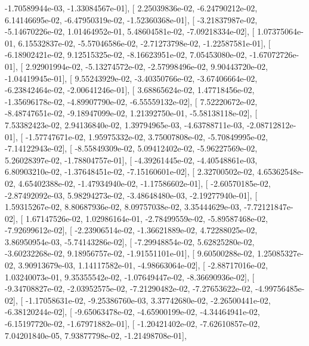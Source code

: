 \documentclass{article}
\begin{document}
         -1.70589944e-03,  -1.33084567e-01],
       [  2.25039836e-02,  -6.24790212e-02,   6.14146695e-02,
         -6.47950319e-02,  -1.52360368e-01],
       [ -3.21837987e-02,  -5.14670226e-02,   1.01464952e-01,
          5.48604581e-02,  -7.09218334e-02],
       [  1.07375064e-01,   6.15532837e-02,  -5.57046586e-02,
         -2.71273798e-02,  -1.22587581e-01],
       [ -6.18902421e-02,   9.12515325e-02,  -8.16623951e-02,
          7.05453080e-02,  -1.67072726e-01],
       [  2.92901994e-02,  -5.13274572e-02,  -2.57998496e-02,
          9.90443720e-02,  -1.04419945e-01],
       [  9.55243929e-02,  -3.40350766e-02,  -3.67406664e-02,
         -6.23842464e-02,  -2.00641246e-01],
       [  3.68865624e-02,   1.47718456e-02,  -1.35696178e-02,
         -4.89907790e-02,  -6.55559132e-02],
       [  7.52220672e-02,  -8.48747651e-02,  -9.18947099e-02,
          1.21392750e-01,  -5.58138118e-02],
       [  7.53382423e-02,   2.94136840e-02,   1.39794965e-03,
         -4.63788711e-03,  -2.08712812e-01],
       [ -1.57747671e-02,   1.95975332e-02,   3.75007808e-02,
         -5.70849995e-02,  -7.14122943e-02],
       [ -8.55849309e-02,   5.09412402e-02,  -5.96227569e-02,
          5.26028397e-02,  -1.78804757e-01],
       [ -4.39261445e-02,  -4.40548861e-03,   6.80903210e-02,
         -1.37648451e-02,  -7.15160601e-02],
       [  2.32700502e-02,   4.65362548e-02,   4.65402388e-02,
         -1.47934940e-02,  -1.17586602e-01],
       [ -2.60570185e-02,  -2.87492092e-03,   5.98294273e-02,
         -3.48648480e-03,  -2.19277940e-01],
       [  1.59315267e-02,   8.80687936e-02,   8.09757038e-02,
          3.35444629e-03,  -7.72121847e-02],
       [  1.67147526e-02,   1.02986164e-01,  -2.78499559e-02,
         -5.89587468e-02,  -7.92699612e-02],
       [ -2.23906514e-02,  -1.36621889e-02,   4.72288025e-02,
          3.86950954e-03,  -5.74143286e-02],
       [ -7.29948854e-02,   5.62825280e-02,  -3.60232268e-02,
          9.18956757e-02,  -1.91551101e-01],
       [  9.60500288e-02,   1.25085327e-02,   3.90913679e-03,
          1.14117582e-01,  -4.98663064e-02],
       [ -2.88717016e-02,   1.03240073e-01,   9.35355542e-02,
         -1.07649447e-02,  -8.36690936e-02],
       [ -9.34708827e-02,  -2.03952575e-02,  -7.21290482e-02,
         -7.27653622e-02,  -4.99756485e-02],
       [ -1.17058631e-02,  -9.25386760e-03,   3.37742680e-02,
         -2.26500441e-02,  -6.38120244e-02],
       [ -9.65063478e-02,  -4.65900199e-02,  -4.34464941e-02,
         -6.15197720e-02,  -1.67971882e-01],
       [ -1.20421402e-02,  -7.62610857e-02,   7.04201840e-05,
          7.93877798e-02,  -1.21498708e-01],
\end{document}
